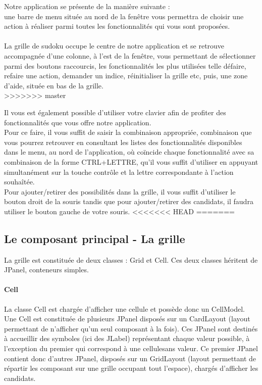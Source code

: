 Notre application se présente de la manière suivante :\\
une barre de menu située au nord de la fenêtre vous permettra de choisir 
une action à réaliser parmi toutes les fonctionnalités qui vous sont proposées.\\
\\
La grille de sudoku occupe le centre de notre application et se retrouve accompagnée 
d'une colonne, à l'est de la fenêtre, vous permettant de sélectionner 
parmi des boutons raccourcis, les fonctionnalités les plus utilisées telle défaire, 
refaire une action, demander un indice, réinitialiser la grille etc, puis, 
une zone d'aide, située en bas de la grille.\\
>>>>>>> master

Il vous est également possible d'utiliser votre clavier afin de profiter 
des fonctionnalités que vous offre notre application.\\
Pour ce faire, il vous suffit de saisir la combinaison appropriée, combinaison 
que vous pourrez retrouver en consultant les listes des fonctionnalités disponibles dans le menu, 
au nord de l'application, où coïncide chaque fonctionnalité avec sa combinaison 
de la forme CTRL+LETTRE, qu'il vous suffit d'utiliser en appuyant simultanément 
sur la touche contrôle et la lettre correspondante à l'action souhaîtée. \\

Pour ajouter/retirer des possibilités dans la grille, il vous suffit d'utiliser 
le bouton droit de la souris tandis que pour ajouter/retirer des candidats, il 
faudra utiliser le bouton gauche de votre souris.
<<<<<<< HEAD
=======

\subsection{Le composant principal - La grille}

La grille est constituée de deux classes : Grid et Cell.
Ces deux classes héritent de JPanel, conteneurs simples.

\paragraph{Cell}
    
La classe Cell est chargée d'afficher une cellule et possède donc un CellModel.
Une Cell est constituée de plusieurs JPanel disposés sur un CardLayout (layout
permettant de n'afficher qu'un seul composant à la fois). Ces JPanel sont
destinés à accueillir des symboles (ici des JLabel) représentant chaque valeur
possible, à l'exception du premier qui correspond à une cellulesans valeur.
Ce premier JPanel contient donc d'autres JPanel, disposés sur un GridLayout
(layout permettant de répartir les composant sur une grille occupant tout l'espace),
chargés d'afficher les candidats.

